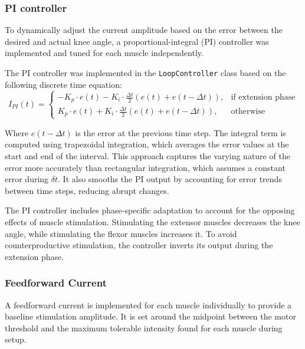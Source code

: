 \subsubsection{PI controller}
To dynamically adjust the current amplitude based on the error between the desired and actual knee angle, a proportional-integral (PI) controller was implemented and tuned for each muscle independently. 

The PI controller was implemented in the \texttt{LoopController} class based on the following discrete time equation:
\begin{equation}
I_{PI}(t) = 
\begin{cases} 
-K_p \cdot e(t) - K_i \cdot \frac{\Delta t}{2} \left(e(t) + e(t-\Delta t)\right), & \text{if extension phase} \\
K_p \cdot e(t) + K_i \cdot \frac{\Delta t}{2} \left(e(t) + e(t-\Delta t)\right), & \text{otherwise}
\end{cases}
\end{equation}

Where \( e(t-\Delta t) \) is the error at the previous time step. The integral term is computed using trapezoidal integration, which averages the error values at the start and end of the interval. This approach captures the varying nature of the error more accurately than rectangular integration, which assumes a constant error during 
\(\delta t\). It also smooths the PI output by accounting for error trends between time steps, reducing abrupt changes.

The PI controller includes phase-specific adaptation to account for the opposing effects of muscle stimulation. Stimulating the extensor muscles decreases the knee angle, while stimulating the flexor muscles increases it. To avoid counterproductive stimulation, the controller inverts its output during the extension phase.

\subsubsection{Feedforward Current}
A feedforward current is implemented for each muscle individually to provide a baseline stimulation amplitude. It is set around the midpoint between the motor threshold and the maximum tolerable intensity found for each muscle during setup. 


